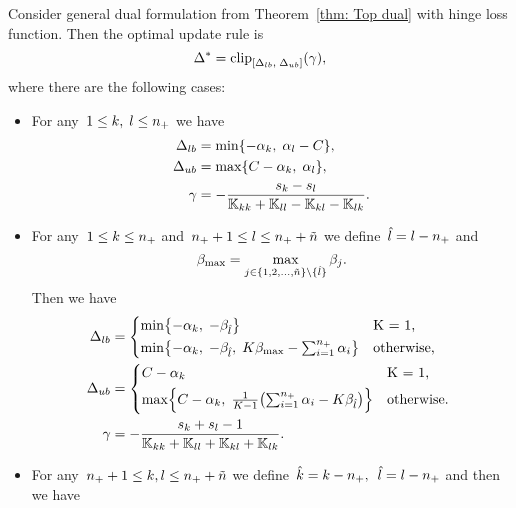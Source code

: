 \begin{theorem}\label{thm:Update rule TopPushK with hinge loss}
  Consider general dual formulation from Theorem~\ref{thm: Top dual} with hinge loss function. Then the optimal update rule is
  \begin{equation*}
    \Delta^{*} = \clip{\Delta_{lb}}{\Delta_{ub}}{\gamma},
  \end{equation*}
  where there are the following cases:
  \begin{itemize}
    \item For any~$1 \le k,\; l \le n_{+}$ we have
    \begin{align*}
      \Delta_{lb} & = \min\{- \alpha_k,\; \alpha_l - C\}, \\
      \Delta_{ub} & = \max\{C - \alpha_k,\; \alpha_l \}, \\
      \gamma      & = -\frac{s_k - s_l}{\mathbb{K}_{kk} + \mathbb{K}_{ll} - \mathbb{K}_{kl} - \mathbb{K}_{lk}}.
    \end{align*}
    \item For any~$1 \le k \le n_{+}$ and~$n_{+} + 1 \le l \le n_{+} + \tilde{n}$ we define~$\hat{l} = l - n_{+}$ and
    \begin{equation*}
      \beta_{\max} = \max_{j \in \{1, 2, \ldots, \tilde{n} \} \setminus \{\hat{l}\}} \beta_j.
    \end{equation*}
    Then we have
    \begin{align*}
      \Delta_{lb} & = 
        \begin{cases*}
          \min \Brac[c]{- \alphak,\;  -\betal} & K = 1, \\
          \min \Brac[c]{- \alphak,\;  -\betal, \; K\beta_{\max} - \sum_{i = 1}^{\npos} \alpha_i} & \textrm{otherwise},
        \end{cases*} \\
      \Delta_{ub} & = 
        \begin{cases*}
            C - \alphak & K = 1, \\
            \max \Brac[c]{C - \alphak, \; \frac{1}{K-1}\Brac{\sum_{i = 1}^{\npos} \alpha_i - K \betal}}  & \textrm{otherwise}.
        \end{cases*} \\
      \gamma & = - \frac{s_k + s_l - 1}{\K_{kk} + \K_{ll} + \K_{kl} + \K_{lk}}.
    \end{align*}
    \item For any~$n_{+} + 1\le k,l \le n_{+} + \tilde{n}$ we define~$\hat{k} = k - n_{+},$~$\hat{l} = l - n_{+}$ and then we have
    \begin{align*}

\end{align*}
\end{itemize}
\end{theorem}
